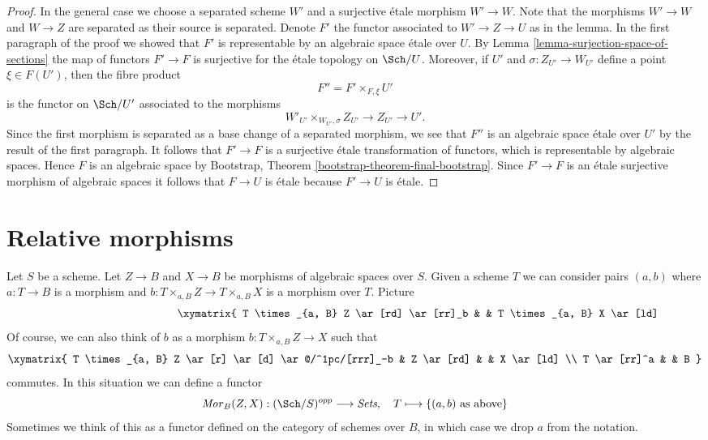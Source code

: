 \begin{proof}
\medskip\noindent
In the general case we choose a separated scheme $W'$ and a surjective
\'etale morphism $W' \to W$. Note that the morphisms $W' \to W$ and
$W \to Z$ are separated as their source is separated. Denote $F'$ the
functor associated to $W' \to Z \to U$ as in the lemma. In the first
paragraph of the proof we showed that $F'$ is representable by an
algebraic space \'etale over $U$. By
Lemma \ref{lemma-surjection-space-of-sections}
the map of functors $F' \to F$ is surjective for the \'etale topology
on $\Sch/U$. Moreover, if $U'$ and $\sigma : Z_{U'} \to W_{U'}$
define a point $\xi \in F(U')$, then the fibre product
$$
F'' = F' \times_{F, \xi} U'
$$
is the functor on $\Sch/U'$ associated to the morphisms
$$
W'_{U'} \times_{W_{U'}, \sigma} Z_{U'} \to Z_{U'} \to U'.
$$
Since the first morphism is separated as a base change of a separated
morphism, we see that $F''$ is an algebraic space \'etale over $U'$
by the result of the first paragraph. It follows that $F' \to F$ is a
surjective \'etale transformation of functors, which is representable
by algebraic spaces. Hence $F$ is an algebraic space by
Bootstrap, Theorem \ref{bootstrap-theorem-final-bootstrap}.
Since $F' \to F$ is an \'etale surjective morphism of algebraic spaces
it follows that $F \to U$ is \'etale because $F' \to U$ is \'etale.
\end{proof}









\section{Relative morphisms}
\label{section-relative-morphisms}

\noindent
Let $S$ be a scheme. Let $Z \to B$ and $X \to B$ be morphisms of
algebraic spaces over $S$. Given a scheme $T$ we can consider pairs
$(a, b)$ where $a : T \to B$
is a morphism and $b : T \times_{a, B} Z \to T \times_{a, B} X$
is a morphism over $T$. Picture
\begin{equation}
\label{equation-hom}
\vcenter{
\xymatrix{
T \times_{a, B} Z \ar[rd] \ar[rr]_b & &
T \times_{a, B} X \ar[ld] & Z \ar[rd] & & X \ar[ld] \\
& T \ar[rrr]^a & & & B
}
}
\end{equation}
Of course, we can also think of $b$ as a morphism
$b : T \times_{a, B} Z \to X$ such that
$$
\xymatrix{
T \times_{a, B} Z \ar[r] \ar[d] \ar@/^1pc/[rrr]_-b &
Z \ar[rd] & & X \ar[ld] \\
T \ar[rr]^a & & B
}
$$
commutes. In this situation we can define a functor
\begin{equation}
\label{equation-hom-functor}
\mathit{Mor}_B(Z, X) : (\Sch/S)^{opp} \longrightarrow \textit{Sets},
\quad
T \longmapsto \{(a, b)\text{ as above}\}
\end{equation}
Sometimes we think of this as a functor defined on the category
of schemes over $B$, in which case we drop $a$ from the notation.

